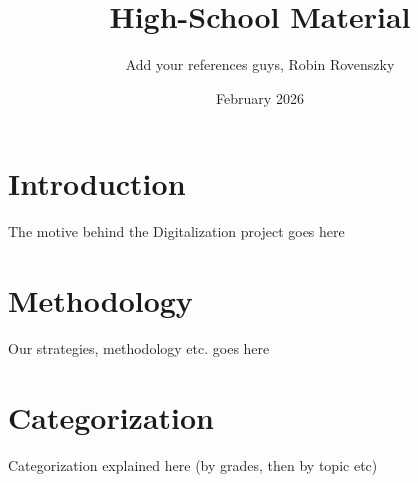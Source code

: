 \documentclass{article}
\title{High-School Material}
\author{Add your references guys, Robin Rovenszky}
\date{February 2026}
\begin{document}
\maketitle

\section{Introduction}
The motive behind the Digitalization project goes here

\section{Methodology}
Our strategies, methodology etc. goes here

\section{Categorization}
Categorization explained here (by grades, then by topic etc)
\end{document}

